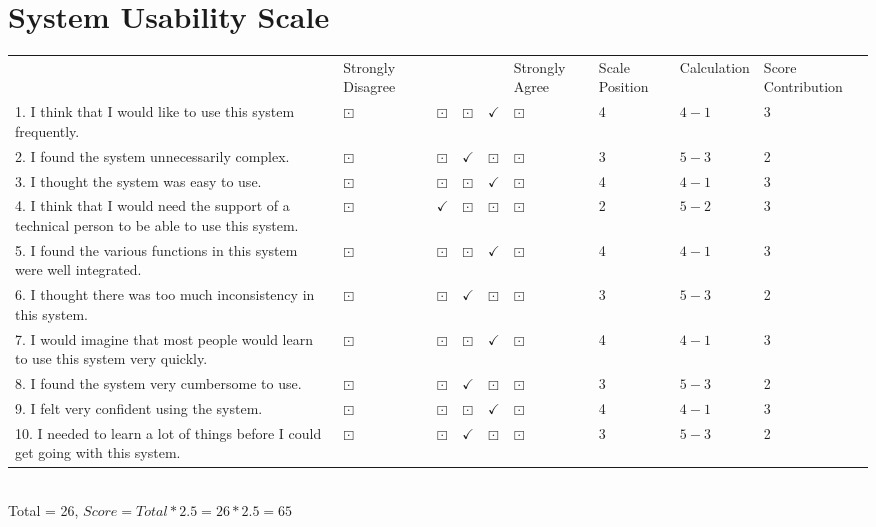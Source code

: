 \documentclass{report}
\begin{document}
\section{System Usability Scale}
\begin{tabular}{ m{1.5in} m{0.4in} m{0.3in} m{0.3in} m{0.3in} m{0.4in} m{0.3in} m{0.7in} m{0.5in} }
& Strongly Disagree & & & & Strongly Agree & Scale Position & Calculation & Score Contribution \\
1. I think that I would like to use this system frequently. & $\boxdot$ & $\boxdot$ & $\boxdot$ & $\checkmark$ & $\boxdot$ & 4 & $4-1$ & 3 \\
2. I found the system unnecessarily complex. & $\boxdot$ & $\boxdot$ & $\checkmark$ & $\boxdot$ & $\boxdot$ & 3 & $5-3$ & 2 \\
3. I thought the system was easy to use. & $\boxdot$ & $\boxdot$ & $\boxdot$ & $\checkmark$ & $\boxdot$ & 4 & $4-1$ & 3 \\
4. I think that I would need the support of a technical person to be able to use this system.  & $\boxdot$ & $\checkmark$ & $\boxdot$ & $\boxdot$ & $\boxdot$ & 2 & $5-2$ & 3\\
5. I found the various functions in this system were well integrated.  & $\boxdot$ & $\boxdot$ & $\boxdot$ & $\checkmark$ & $\boxdot$ & 4 & $4-1$ & 3 \\ 
6. I thought there was too much inconsistency in this system.  & $\boxdot$ & $\boxdot$ & $\checkmark$ & $\boxdot$ & $\boxdot$ & 3 & $5-3$ & 2 \\
7. I would imagine that most people would learn to use this system very quickly.  & $\boxdot$ & $\boxdot$ & $\boxdot$ & $\checkmark$ & $\boxdot$ & 4 & $4-1$ & 3 \\
8. I found the system very cumbersome to use.  & $\boxdot$ & $\boxdot$ & $\checkmark$ & $\boxdot$ & $\boxdot$ & 3 & $5-3$ & 2 \\
9. I felt very confident using the system.  & $\boxdot$ & $\boxdot$ & $\boxdot$ & $\checkmark$ & $\boxdot$ & 4 & $4-1$ & 3 \\
10. I needed to learn a lot of things before I could get going with this system.  & $\boxdot$ & $\boxdot$ & $\checkmark$ & $\boxdot$ & $\boxdot$ & 3 & $5-3$ & 2 \\
\end{tabular}
\\
Total = 26, $Score = Total * 2.5 = 26 * 2.5 = 65$

\newpage
\end{document}
